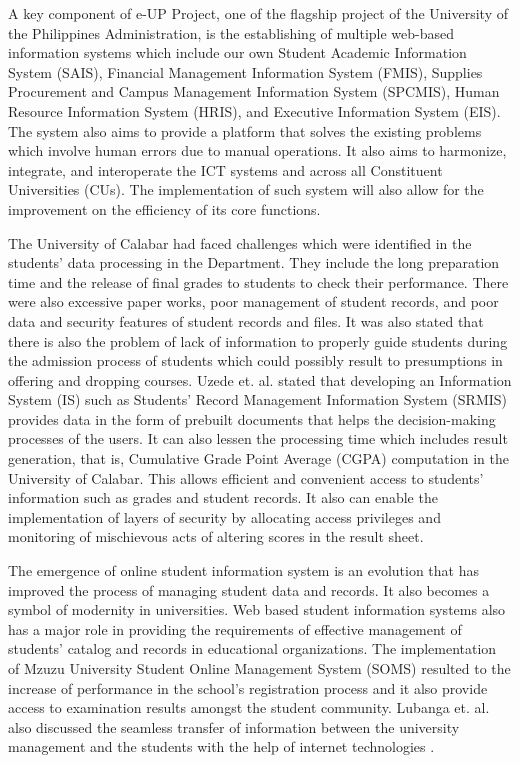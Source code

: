 \documentclass[11pt,a4paper,titlepage]{article}
\begin{document}
A key component of e-UP Project, one of the flagship project of the University of the Philippines Administration, is the establishing of multiple web-based information systems which include our own Student Academic Information System (SAIS), Financial Management Information System (FMIS), Supplies Procurement and Campus Management Information System (SPCMIS), Human Resource Information System (HRIS), and Executive Information System (EIS). The system also aims to provide a platform that solves the existing problems which involve human errors due to manual operations. It also aims to harmonize, integrate, and interoperate the ICT systems and across all Constituent Universities (CUs). The implementation of such system will also allow for the improvement on the efficiency of its core functions.  \cite{Caro} 

The University of Calabar had faced challenges which were identified in the students' data processing in the Department. They include the long preparation time and the release of final grades to students to check their performance. There were also excessive paper works, poor management of student records, and poor data and security features of student records and files. It was also stated that there is also the problem of lack of information to properly guide students during the admission process of students which could possibly result to presumptions in offering and dropping courses. Uzede et. al. stated that developing an Information System (IS) such as Students' Record Management Information System (SRMIS) provides data in the form of prebuilt documents that helps the decision-making processes of the users. It can also lessen the processing time which includes result generation, that is, Cumulative Grade Point Average (CGPA) computation in the University of Calabar. This allows efficient and convenient access to students' information such as grades and student records. It also can enable the implementation of layers of security by allocating access privileges and monitoring of mischievous acts of altering scores in the result sheet.\cite{Ude}

The emergence of online student information system is an evolution that has improved the process of managing student data and records. It also becomes a symbol of modernity in universities. Web based student information systems also has a major role in providing the requirements of effective management of students' catalog and records in educational organizations. The implementation of Mzuzu University Student Online Management System (SOMS) resulted to the increase of performance in the school's registration process and it also provide access to examination results amongst the student community. Lubanga et. al. also discussed the seamless transfer of information between the university management and the students with the help of internet technologies \cite{Lubanga}. 
\end{document}
